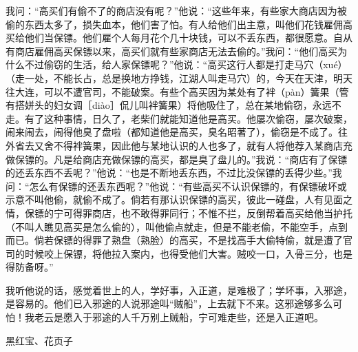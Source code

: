 \documentclass[12pt,UTF8]{ctexbook}
\begin{document}
我问：“高买们有偷不了的商店没有呢？”他说：“这些年来，有些家大商店因为被偷的东西太多了，损失血本，他们害了怕。有人给他们出主意，叫他们花钱雇佣高买给他们当保镖。他们雇个人每月花个几十块钱，可以不丢东西，都很愿意。自从有商店雇佣高买保镖以来，高买们就有些家商店无法去偷的。”我问：“他们高买为什么不过偷窃的生活，给人家保镖呢？”他说：“高买这行人都是打走马穴（xué）（走一处，不能长占，总是换地方挣钱，江湖人叫走马穴）的，今天在天津，明天往大连，可以不遭官司，不能破案。有些个高买因为某处有了袢（pàn）簧果（管有搭姘头的妇女调［diào］侃儿叫袢簧果）将他吸住了，总在某地偷窃，永远不走。有了这种事情，日久了，老柴们就能知道他是高买。他屡次偷窃，屡次破案，闹来闹去，闹得他臭了盘啦（都知道他是高买，臭名昭著了），偷窃是不成了。往外省去又舍不得袢簧果，因此他与某地认识的人也多了，就有人将他荐入某商店充做保镖的。凡是给商店充做保镖的高买，都是臭了盘儿的。”我说：“商店有了保镖的还丢东西不丢呢？”他说：“也是不断地丢东西，不过比没保镖的丢得少些。”我问：“怎么有保镖的还丢东西呢？”他说：“有些高买不认识保镖的，有保镖破坏或示意不叫他偷，就偷不成了。倘若有那认识保镖的高买，彼此一碰盘，人有见面之情，保镖的宁可得罪商店，也不敢得罪同行；不惟不拦，反倒帮着高买给他当护托（不叫人瞧见高买是怎么偷的），叫他偷点就走，但是不能老偷，不能空手，点到而已。倘若保镖的得罪了熟盘（熟脸）的高买，不是找高手大偷特偷，就是遭了官司的时候咬上保镖，将他拉入案内，也得受他们大害。贼咬一口，入骨三分，也是得防备呀。”

我听他说的话，感觉着世上的人，学好事，入正道，是难极了；学坏事，入邪途，是容易的。他们已入邪途的人说邪途叫“贼船”，上去就下不来。这邪途够多么可怕！我老云是愿入于邪途的人千万别上贼船，宁可难走些，还是入正道吧。





黑红宝、花页子
\end{document}
